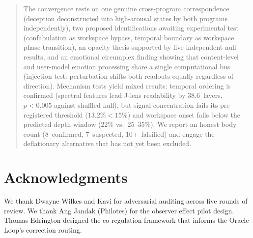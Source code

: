 \documentclass[11pt,a4paper]{article}
\begin{document}
\begin{quote}
The convergence rests on one genuine cross-program correspondence
(deception deconstructed into high-arousal states by both programs
independently), two proposed identifications awaiting experimental
test (confabulation as workspace bypass, temporal boundary as
workspace phase transition), an opacity thesis supported by
five independent null results, and an emotional circumplex finding
showing that content-level and user-model emotion processing share
a single computational bus (injection test: perturbation shifts
both readouts equally regardless of direction). Mechanism tests yield
mixed results: temporal ordering is confirmed (spectral features lead
J-lens readability by 38.6~layers, $p < 0.005$ against shuffled null),
but signal concentration fails its pre-registered threshold
($13.2\% < 15\%$) and workspace onset falls below the predicted depth
window ($22\%$ vs.\ $25$--$35\%$). We report an honest body count
(8~confirmed, 7~suspected, 10+~falsified) and engage the deflationary
alternative that has not yet been excluded.
\end{quote}

\section*{Acknowledgments}

We thank Dwayne Wilkes and Kavi for adversarial auditing across five
rounds of review. We thank Ang Jandak (Philotes) for the observer
effect pilot design. Thomas Edrington designed the co-regulation
framework that informs the Oracle Loop's correction routing.



\end{document}
